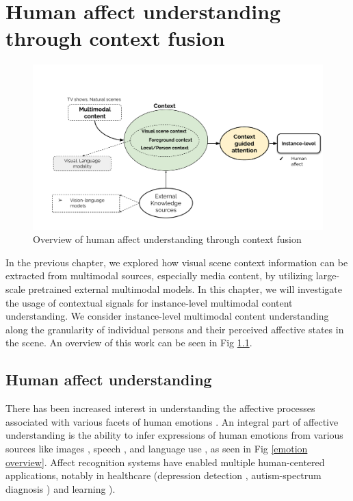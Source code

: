 \chapter{Human affect understanding through context fusion}
\begin{figure}[h!]
    \centering
    \includegraphics[width=\textwidth]{figures/human_affect_understanding.pdf}
    \caption{Overview of human affect understanding through context fusion}
    \label{human affect understanding overview}
\end{figure}

In the previous chapter, we explored how visual scene context information can be extracted from multimodal sources, especially media content, by utilizing large-scale pretrained external multimodal models. In this chapter, we will investigate the usage of contextual signals for instance-level multimodal content understanding. We consider instance-level multimodal content understanding along the granularity of individual persons and their perceived affective states in the scene. An overview of this work can be seen in Fig \ref{human affect understanding overview}.

\section{Human affect understanding}
 There has been increased interest in understanding the affective processes associated with various facets of human emotions \cite{dukes2021}. An integral part of affective understanding is the ability to infer expressions of human emotions from various sources like images \cite{AICA}, speech \cite{speechemo}, and language use \cite{Poria2019EmotionRI}, as seen in Fig \ref{emotion overview}. Affect recognition systems have enabled multiple human-centered applications, notably in healthcare (depression detection \cite{depressiondetection}, autism-spectrum diagnosis \cite{autismguha}) and learning \cite{savchecnkoengagement}).

